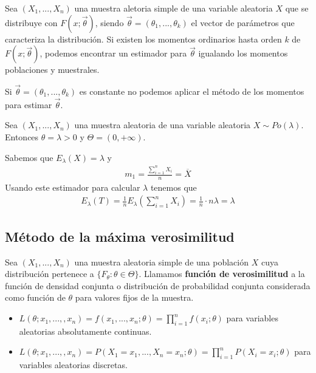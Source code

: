 \begin{defi}
    Sea $(X_1,...,X_n)$ una muestra aletoria simple de una variable aleatoria $X$ que se distribuye con $F(x;\overrightarrow{\theta})$, siendo $\overrightarrow{\theta} =(\theta_1,...,\theta_k)$ el vector de parámetros que caracteriza la distribución. Si existen los momentos ordinarios hasta orden $k$ de $F(x;\overrightarrow{\theta})$, podemos encontrar un estimador para $\overrightarrow{\theta}$ igualando los momentos poblaciones y muestrales.
\end{defi}

\begin{obs}
    Si $\overrightarrow{\theta} =(\theta_1,...,\theta_k)$ es constante no podemos aplicar el método de los momentos para estimar $\overrightarrow{\theta}$.
\end{obs}

\begin{ejemplo}
    Sea $(X_1,...,X_n)$ una muestra aleatoria de una variable aleatoria $X \sim Po(\lambda)$. Entonces $\theta = \lambda >0$ y $\Theta = (0,+\infty)$.

    Sabemos que $E_{\lambda}(X) = \lambda$ y
    \begin{align*}
        m_1 = \frac{\sum_{i=1}^{n}{X_i}}{n} = \overline{X}
    \end{align*}
    Usando este estimador para calcular $\lambda$ tenemos que
    \begin{align*}
        E_{\lambda}(T) = \frac{1}{n}{E_{\lambda}{\left( \sum_{i=1}^{n}{X_i}\right)}} = \frac{1}{n} \cdot n\lambda = \lambda
    \end{align*}
\end{ejemplo}

\subsection{Método de la máxima verosimilitud}

\begin{defi}
    Sea $(X_1,...,X_n)$ una muestra aleatoria simple de una población $X$ cuya distribución pertenece a $\{F_{\theta} : \theta \in \Theta \}$. Llamamos \textbf{función de verosimilitud }a la función de densidad conjunta o distribución de probabilidad conjunta considerada como función de $\theta$ para valores fijos de la muestra.
    \begin{itemize}
        \item $L(\theta;x_1,...,,x_n) = f(x_1,...,x_n;\theta) = \prod_{i=1}^{n}{f(x_i;\theta)}$ para variables aleatorias absolutamente continuas.
        \item $L(\theta;x_1,...,,x_n) = P(X_1 = x_1,...,X_n = x_n;\theta) = \prod_{i=1}^{n}{P(X_i = x_i;\theta)}$ para variables aleatorias discretas.
    \end{itemize}
\end{defi}

